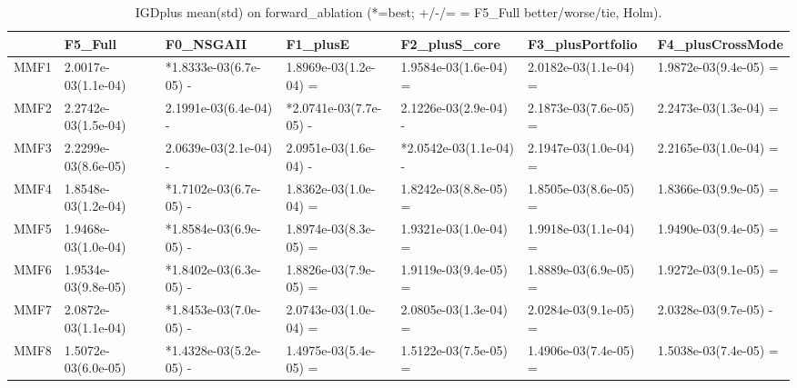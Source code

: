 \begin{table}[t]
\centering
\caption{IGDplus mean(std) on forward_ablation (*=best; +/-/= = F5_Full better/worse/tie, Holm).}
\label{tab:forward_ablation_IGDplus}
\begin{tabular}{lllllll}
\toprule
 & F5\_Full & F0\_NSGAII & F1\_plusE & F2\_plusS\_core & F3\_plusPortfolio & F4\_plusCrossMode \\
\midrule
MMF1 & 2.0017e-03(1.1e-04) & *1.8333e-03(6.7e-05) - & 1.8969e-03(1.2e-04) = & 1.9584e-03(1.6e-04) = & 2.0182e-03(1.1e-04) = & 1.9872e-03(9.4e-05) = \\
MMF2 & 2.2742e-03(1.5e-04) & 2.1991e-03(6.4e-04) - & *2.0741e-03(7.7e-05) - & 2.1226e-03(2.9e-04) - & 2.1873e-03(7.6e-05) = & 2.2473e-03(1.3e-04) = \\
MMF3 & 2.2299e-03(8.6e-05) & 2.0639e-03(2.1e-04) - & 2.0951e-03(1.6e-04) - & *2.0542e-03(1.1e-04) - & 2.1947e-03(1.0e-04) = & 2.2165e-03(1.0e-04) = \\
MMF4 & 1.8548e-03(1.2e-04) & *1.7102e-03(6.7e-05) - & 1.8362e-03(1.0e-04) = & 1.8242e-03(8.8e-05) = & 1.8505e-03(8.6e-05) = & 1.8366e-03(9.9e-05) = \\
MMF5 & 1.9468e-03(1.0e-04) & *1.8584e-03(6.9e-05) - & 1.8974e-03(8.3e-05) = & 1.9321e-03(1.0e-04) = & 1.9918e-03(1.1e-04) = & 1.9490e-03(9.4e-05) = \\
MMF6 & 1.9534e-03(9.8e-05) & *1.8402e-03(6.3e-05) - & 1.8826e-03(7.9e-05) = & 1.9119e-03(9.4e-05) = & 1.8889e-03(6.9e-05) = & 1.9272e-03(9.1e-05) = \\
MMF7 & 2.0872e-03(1.1e-04) & *1.8453e-03(7.0e-05) - & 2.0743e-03(1.0e-04) = & 2.0805e-03(1.3e-04) = & 2.0284e-03(9.1e-05) = & 2.0328e-03(9.7e-05) - \\
MMF8 & 1.5072e-03(6.0e-05) & *1.4328e-03(5.2e-05) - & 1.4975e-03(5.4e-05) = & 1.5122e-03(7.5e-05) = & 1.4906e-03(7.4e-05) = & 1.5038e-03(7.4e-05) = \\
\bottomrule
\end{tabular}
\end{table}
